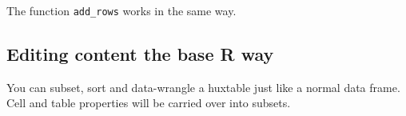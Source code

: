 \documentclass[]{article}
\newenvironment{Shaded}{\begin{snugshade}}{\end{snugshade}}
\newcommand{\CommentTok}[1]{\textcolor[rgb]{0.56,0.35,0.01}{\textit{#1}}}
\newcommand{\DecValTok}[1]{\textcolor[rgb]{0.00,0.00,0.81}{#1}}
\newcommand{\KeywordTok}[1]{\textcolor[rgb]{0.13,0.29,0.53}{\textbf{#1}}}
\newcommand{\NormalTok}[1]{#1}
\newcommand{\OperatorTok}[1]{\textcolor[rgb]{0.81,0.36,0.00}{\textbf{#1}}}
\newcommand{\StringTok}[1]{\textcolor[rgb]{0.31,0.60,0.02}{#1}}
\begin{document}
\FloatBarrier

The function \texttt{add\_rows} works in the same way.

\hypertarget{editing-content-the-base-r-way}{%
\subsection{Editing content the base R
way}\label{editing-content-the-base-r-way}}

You can subset, sort and data-wrangle a huxtable just like a normal data
frame. Cell and table properties will be carried over into subsets.

\begin{Shaded}
\end{Shaded}

 
  \providecommand{\huxb}[2]{\arrayrulecolor[RGB]{#1}\global\arrayrulewidth=#2pt}
  \providecommand{\huxvb}[2]{\color[RGB]{#1}\vrule width #2pt}
  \providecommand{\huxtpad}[1]{\rule{0pt}{\baselineskip+#1}}
  \providecommand{\huxbpad}[1]{\rule[-#1]{0pt}{#1}}
\end{document}

